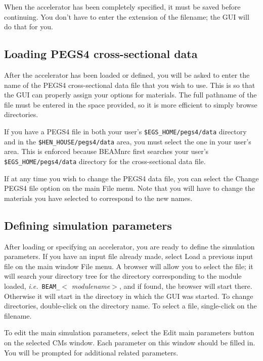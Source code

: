 \documentclass[12pt,twoside]{article}
\newcommand{\ie}{{\em i.e.}}
\begin{document}
When the accelerator has been completely specified, it must
be saved before continuing.  You don't have to enter the extension of
the filename; the GUI will do that for you.

\subsection{Loading PEGS4 cross-sectional data}

After the accelerator has been loaded or defined, you will be asked to
enter the name of the PEGS4 cross-sectional data file that you wish to
use.  This is so that the GUI can properly assign your options for
materials.  The full pathname of the file must be entered in the space
provided, so it is more efficient to simply browse directories.

If you have a PEGS4 file in both your user's {\tt \$EGS\_HOME/pegs4/data}
directory
and in the {\tt \$HEN\_HOUSE/pegs4/data} area, you must select the
one in your user's area.  This is
enforced because BEAMnrc first searches your user's {\tt \$EGS\_HOME/pegs4/data}
directory for the cross-sectional data file.

If at any time you wish to change the PEGS4 data file, you can select
the {\sf Change PEGS4 file} option on the main {\sf File} menu.  Note that you
will have to change the materials you have selected to correspond to the
new names.

\subsection{Defining simulation parameters}

After loading or specifying an accelerator, you are ready to define the
simulation parameters.  If
you have an input file already made, select {\sf Load a previous input
file} on the main window {\sf File} menu.  A browser will allow you to select
the file; it will search your directory tree for the directory
corresponding to the module loaded, \ie~{\tt BEAM\_}$<${\em
modulename}$>$, and if found, the browser will start
there.  Otherwise it will start in the directory in which the GUI was
started.  To change directories, double-click on the directory name.  To
select a file, single-click on the filename.

To edit the main simulation parameters, select the {\sf Edit main
parameters} button on the selected CMs window.
Each parameter on this window should be filled in.  You will be prompted
for additional related parameters.
\end{document}
